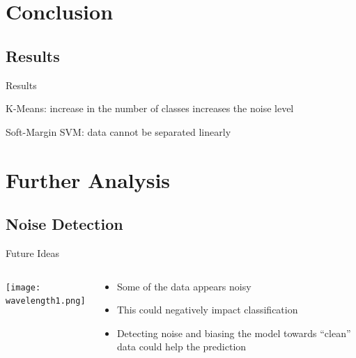 \documentclass[11pt]{beamer}
\begin{document}

\section{Conclusion}
\subsection{Results}
\begin{frame}{Results}
\item K-Means: increase in the number of classes increases the noise level
\item Soft-Margin SVM: data cannot be separated linearly
\end{frame}


\section{Further Analysis}
\subsection{Noise Detection}
\begin{frame}{Future Ideas}
\begin{columns}[T]
\begin{column}{.48\textwidth}
\texttt{[image: wavelength1.png]}
\end{column}
\hfill
\begin{column}{.48\textwidth}
\begin{itemize}
\item Some of the data appears noisy
\item This could negatively impact classification
\item Detecting noise and biasing the model towards ``clean'' data could help the prediction
\end{itemize}
\end{column}
\end{columns}
\end{frame}
\end{document}
